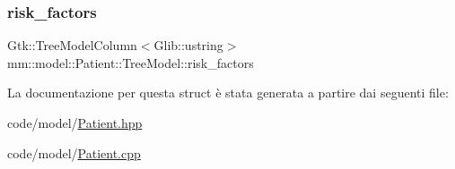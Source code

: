 \subsubsection{\texorpdfstring{risk\+\_\+factors}{risk\_factors}}
{\footnotesize\ttfamily Gtk\+::\+Tree\+Model\+Column$<$Glib\+::ustring$>$ mm\+::model\+::\+Patient\+::\+Tree\+Model\+::risk\+\_\+factors}



La documentazione per questa struct è stata generata a partire dai seguenti file\+:\begin{DoxyCompactItemize}
\item 
code/model/\mbox{\hyperlink{_patient_8hpp}{Patient.\+hpp}}\item 
code/model/\mbox{\hyperlink{_patient_8cpp}{Patient.\+cpp}}\end{DoxyCompactItemize}
